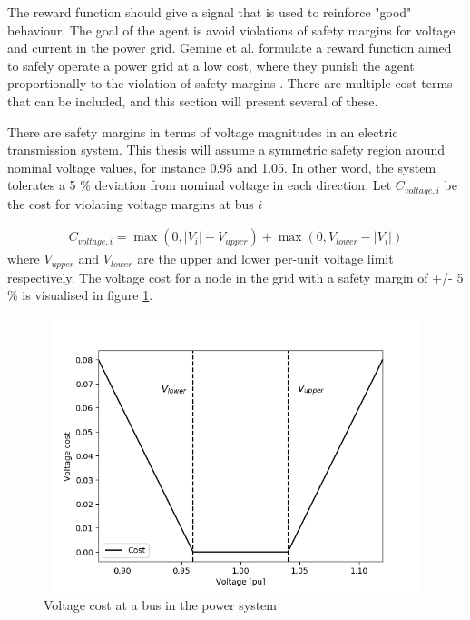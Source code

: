 \documentclass[class=book, crop=false]{standalone}
\begin{document}
The reward function should give a signal that is used to reinforce "good" behaviour. The goal of the agent is avoid violations of safety margins for voltage and current in the power grid. Gemine et al. formulate a reward function aimed to safely operate a power grid at a low cost, where they punish the agent proportionally to the violation of safety margins \cite{active_network_management}. There are multiple cost terms that can be included, and this section will present several of these. 

There are safety margins in terms of voltage magnitudes in an electric transmission system. 
This thesis will assume a symmetric safety region around nominal voltage values, for instance 0.95 and 1.05. In other word, the system tolerates a 5 \% deviation from nominal voltage in each direction. Let $C_{voltage,i}$ be the cost for violating voltage margins at bus $i$


\begin{equation}
   \begin{aligned}
   \label{eq:problem:voltage_margins_cost}
    C_{voltage,i} = \max(0,|V_{i}| - V_{upper}) + \max(0,V_{lower}- |V_{i}|)
    \end{aligned} 
\end{equation}
where $V_{upper}$ and $V_{lower}$ are the upper and lower per-unit voltage limit respectively. The voltage cost for a node in the grid with a safety margin of +/- 5 \%  is visualised in figure \ref{fig:problem:voltage_cost}.
\begin{figure}[ht]
    \center
\includegraphics[height=8cm, width=12cm]{figures/voltage_cost.png}
    \caption[size = 9]{Voltage cost at a bus in the power system}
    \label{fig:problem:voltage_cost}
\end{figure}
\end{document}

